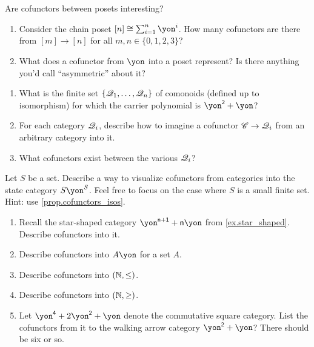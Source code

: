 \documentclass[Book-Poly]{subfiles}
\begin{document}
\begin{exercise}
Are cofunctors between posets interesting?
\begin{enumerate}
	\item Consider the chain poset $[n]\cong\sum_{i=1}^n\yon^i$. How many cofunctors are there from $[m]\to[n]$ for all $m,n\in\{0,1,2,3\}$?
	\item What does a cofunctor from $\yon$ into a poset represent? Is there anything you'd call ``asymmetric'' about it?
\qedhere
\end{enumerate}
\end{exercise}

\begin{exercise}
\begin{enumerate}
	\item What is the finite set $\{\mathscr{Q}_1,\ldots,\mathscr{Q}_n\}$ of comonoids (defined up to isomorphism) for which the carrier polynomial is $\yon^\2+\yon$?
	\item For each category $\mathscr{Q}_i$, describe how to imagine a cofunctor $\mathscr{C}\to\mathscr{Q}_i$ from an arbitrary category into it.
	\item What cofunctors exist between the various $\mathscr{Q}_i$?
\qedhere
\end{enumerate}
\end{exercise}

\begin{exercise}
Let $S$ be a set. Describe a way to visualize cofunctors from categories into the state category $S\yon^S$. Feel free to focus on the case where $S$ is a small finite set. Hint: use \cref{prop.cofunctors_isos}.
\end{exercise}

\begin{exercise}
\begin{enumerate}
	\item Recall the star-shaped category $\yon^{\ord{n}+\1}+\ord{n}\yon$ from \cref{ex.star_shaped}. Describe cofunctors into it.
	\item Describe cofunctors into $A\yon$ for a set $A$.
	\item Describe cofunctors into $(\mathbb{N},\leq)$.
	\item Describe cofunctors into $(\mathbb{N},\geq)$.
	\item Let $\yon^\4+2\yon^\2+\yon$ denote the commutative square category. List the cofunctors from it to the walking arrow category $\yon^\2+\yon$? There should be six or so.
\qedhere
\end{enumerate}
\end{exercise}
\end{document}
